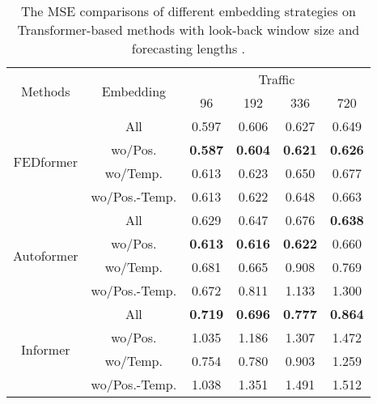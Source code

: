 \documentclass[10pt,twocolumn,letterpaper]{article}
\begin{document}
\begin{table}[h]
    \centering
\scalebox{0.85}
    {
            \begin{tabular}{c|c|cccc}
            \hline
            \multirow{2}{*}{Methods}    & \multirow{2}{*}{Embedding}                & \multicolumn{4}{c}{Traffic}                                   \\
                                         &                            & 96             & 192            & 336            & 720            \\\hline \hline
            \multirow{4}{*}{FEDformer}   & All                       & 0.597          & 0.606          & 0.627          & 0.649          \\
                                         & wo/Pos.                   & \textbf{0.587} & \textbf{0.604} & \textbf{0.621} & \textbf{0.626} \\
                                         & wo/Temp.                  & 0.613          & 0.623          & 0.650          & 0.677          \\
                                         & wo/Pos.-Temp.             & 0.613          & 0.622          & 0.648          & 0.663          \\\hline\hline
            \multirow{4}{*}{Autoformer}  & All              & 0.629          & 0.647          & 0.676          & \textbf{0.638} \\
                                         & wo/Pos.          & \textbf{0.613} & \textbf{0.616} & \textbf{0.622} & 0.660          \\
                                         & wo/Temp.         & 0.681          & 0.665          & 0.908          & 0.769          \\
                                         & wo/Pos.-Temp.    & 0.672          & 0.811          & 1.133          & 1.300          \\\hline\hline
            \multirow{4}{*}{Informer}    & All              & \textbf{0.719} & \textbf{0.696} & \textbf{0.777} & \textbf{0.864}          \\
                                         & wo/Pos.          & 1.035          & 1.186          & 1.307          & 1.472          \\
                                         & wo/Temp.         & 0.754          & 0.780          & 0.903          & 1.259 \\
                                         & wo/Pos.-Temp.    & 1.038          & 1.351          & 1.491          & 1.512         
             \\\hline
            \end{tabular}
            }
            \vspace{-0.3cm}
            \caption{The MSE comparisons of different embedding strategies on Transformer-based methods with look-back window size  and forecasting lengths . }
\label{tab:embedding}
\vspace{-0.5cm}
\end{table}      
            
\end{document}
